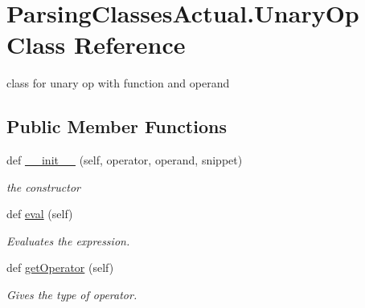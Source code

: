 \hypertarget{class_parsing_classes_actual_1_1_unary_op}{}\section{Parsing\+Classes\+Actual.\+Unary\+Op Class Reference}
\label{class_parsing_classes_actual_1_1_unary_op}


class for unary op with function and operand  


\subsection*{Public Member Functions}
\begin{DoxyCompactItemize}
\item 
def \hyperlink{class_parsing_classes_actual_1_1_unary_op_ae822716a1ac45674aa119773fb9eb0aa}{\+\_\+\+\_\+init\+\_\+\+\_\+} (self, operator, operand, snippet)
\begin{DoxyCompactList}\small\item\em the constructor \end{DoxyCompactList}\item 
\mbox{\label{class_parsing_classes_actual_1_1_unary_op_a825795bcc2929152bb0ca9618ab419ad}} 
def \hyperlink{class_parsing_classes_actual_1_1_unary_op_a825795bcc2929152bb0ca9618ab419ad}{eval} (self)
\begin{DoxyCompactList}\small\item\em Evaluates the expression. \end{DoxyCompactList}\item 
\mbox{\label{class_parsing_classes_actual_1_1_unary_op_a708a1db9dea33517c487d535082c49c4}} 
def \hyperlink{class_parsing_classes_actual_1_1_unary_op_a708a1db9dea33517c487d535082c49c4}{get\+Operator} (self)
\begin{DoxyCompactList}\small\item\em Gives the type of operator. \end{DoxyCompactList}\end{DoxyCompactItemize}
